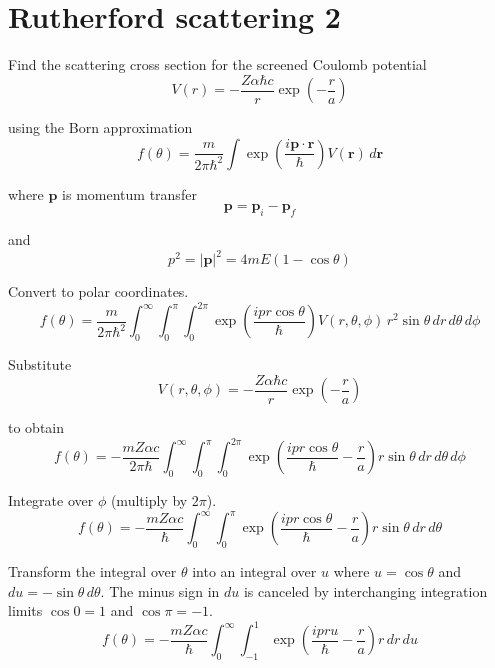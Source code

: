 

\section*{Rutherford scattering 2}

Find the scattering cross section for the screened Coulomb potential
\begin{equation*}
V(r)=-\frac{Z\alpha\hbar c}{r}\exp\left(-\frac{r}{a}\right)
\end{equation*}

using the Born approximation
\begin{equation*}
f(\theta)
=\frac{m}{2\pi\hbar^2}
\int\exp\left(\frac{i\mathbf p\cdot\mathbf r}{\hbar}\right)V(\mathbf r)\,d\mathbf r
\end{equation*}

where $\mathbf p$ is momentum transfer
\begin{equation*}
\mathbf p=\mathbf p_i-\mathbf p_f
\end{equation*}

and
\begin{equation*}
p^2=|\mathbf p|^2=4mE(1-\cos\theta)
\end{equation*}

Convert to polar coordinates.
\begin{equation*}
f(\theta)
=\frac{m}{2\pi\hbar^2}
\int_0^\infty
\int_0^\pi
\int_0^{2\pi}
\exp\left(\frac{ipr\cos\theta}{\hbar}\right)V(r,\theta,\phi)
\,r^2\sin\theta\,dr\,d\theta\,d\phi
\end{equation*}

Substitute
\begin{equation*}
V(r,\theta,\phi)=-\frac{Z\alpha\hbar c}{r}\exp\left(-\frac{r}{a}\right)
\end{equation*}

to obtain
\begin{equation*}
f(\theta)
=-\frac{mZ\alpha c}{2\pi\hbar}
\int_0^\infty
\int_0^\pi
\int_0^{2\pi}
\exp\left(\frac{ipr\cos\theta}{\hbar}-\frac{r}{a}\right)
r\sin\theta\,dr\,d\theta\,d\phi
\end{equation*}

Integrate over $\phi$ (multiply by $2\pi$).
\begin{equation*}
f(\theta)
=-\frac{mZ\alpha c}{\hbar}
\int_0^\infty
\int_0^\pi
\exp\left(\frac{ipr\cos\theta}{\hbar}-\frac{r}{a}\right)
r\sin\theta\,dr\,d\theta
\end{equation*}

Transform the integral over $\theta$ into an integral over $u$
where $u=\cos\theta$ and $du=-\sin\theta\,d\theta$.
The minus sign in $du$ is canceled by interchanging integration limits
$\cos0=1$ and $\cos\pi=-1$.
\begin{equation*}
f(\theta)
=-\frac{mZ\alpha c}{\hbar}
\int_0^\infty
\int_{-1}^1
\exp\left(\frac{ipru}{\hbar}-\frac{r}{a}\right)
r\,dr\,du
\end{equation*}

